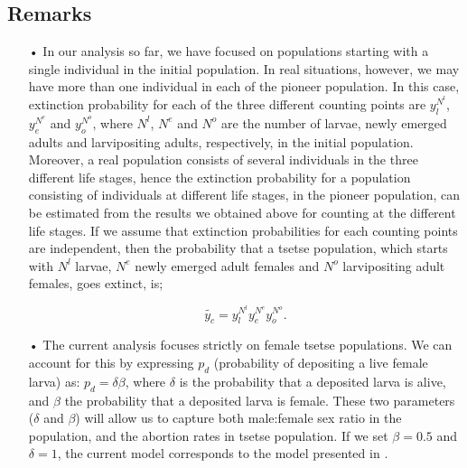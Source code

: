 \documentclass[smallextended]{svjour3}
\newcommand{\comment}[3]{\textcolor{#1}{\textbf{[#2: }\textit{#3}\textbf{]}}}
\newcommand{\jd}[1]{\comment{cyan}{JD}{#1}}
\begin{document}
\subsection*{\bf Remarks}
\begin{itemize}
	\item[•] In our analysis so far, we have focused on populations starting with a single individual in the initial population. In real situations, however, we may have more than one individual in each of the pioneer population.  In this case, extinction probability for each of the three different counting points are $y_l^{N^l}$, $y_e^{N^e}$ and $y_o^{N^o}$, where $N^l$, $N^e$ and $N^o$ are the number of larvae, newly emerged adults and larvipositing adults, respectively, in the initial population. Moreover, a real population consists of several individuals in the three different life stages, hence the extinction probability for a population consisting of individuals at different life stages, in the pioneer population, can be estimated from the results we obtained above for counting at the different life stages.  If we assume that extinction probabilities for each counting points are independent, then the probability that a tsetse population, which starts with $N^l$ larvae, $N^e$ newly emerged adult females and $N^o$ larvipositing adult females, goes extinct, is;
	
	$$\tilde{y_c}=y_l^{N^l} y_e^{N^e} y_o^{N^o}.$$
	\item[•] The current analysis focuses strictly on female tsetse populations. We can account for this  by expressing  $p_d$ (probability of depositing a live female larva) as:  $p_d =\delta \beta$, where $\delta$ is the probability that a deposited larva is alive, and $\beta$ the probability that a deposited larva is female.  These two parameters ($\delta$ and $\beta$) will allow us to capture both male:female sex ratio in the population, and  the abortion rates in tsetse population.  If we set $\beta = 0.5$ and $\delta = 1$, the current model corresponds to the model presented in \cite{Hargrove2005a}. 
\end{itemize}
\end{document}
